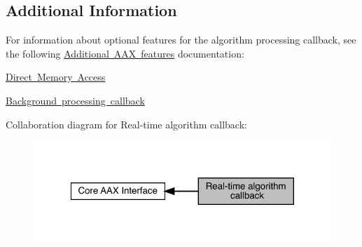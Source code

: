  \hypertarget{a00797_alg_seealso}{}\subsection{Additional Information}\label{a00797_alg_seealso}
 For information about optional features for the algorithm processing callback, see the following \mbox{\hyperlink{a00802}{Additional A\+AX features}} documentation\+:

 \begin{DoxyItemize}
\item \mbox{\hyperlink{a00810}{Direct Memory Access}} \item \mbox{\hyperlink{a00811}{Background processing callback}}\end{DoxyItemize}
 Collaboration diagram for Real-\/time algorithm callback\+:
\nopagebreak
\begin{figure}[H]
\begin{center}
\leavevmode
\includegraphics[width=320pt]{a00797}
\end{center}
\end{figure}
